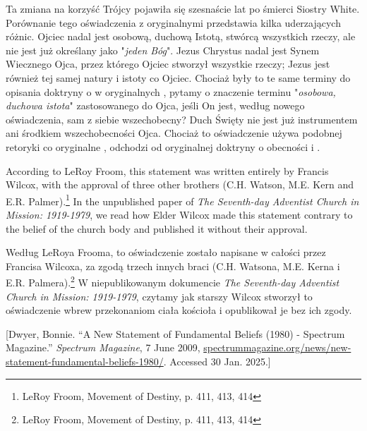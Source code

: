 Ta zmiana na korzyść Trójcy pojawiła się szesnaście lat po śmierci Siostry White. Porównanie tego oświadczenia z oryginalnymi  przedstawia kilka uderzających różnic. Ojciec nadal jest osobową, duchową Istotą, stwórcą wszystkich rzeczy, ale nie jest już określany jako "\textit{jeden Bóg}". Jezus Chrystus nadal jest Synem Wiecznego Ojca, przez którego Ojciec stworzył wszystkie rzeczy; Jezus jest również tej samej natury i istoty co Ojciec. Chociaż były to te same terminy do opisania doktryny o  w oryginalnych , pytamy o znaczenie terminu "\textit{osobowa, duchowa istota}" zastosowanego do Ojca, jeśli On jest, według nowego oświadczenia, sam z siebie wszechobecny? Duch Święty nie jest już instrumentem ani środkiem wszechobecności Ojca. Chociaż to oświadczenie używa podobnej retoryki co oryginalne , odchodzi od oryginalnej doktryny o obecności i .


According to LeRoy Froom, this statement was written entirely by Francis Wilcox, with the approval of three other brothers (C.H. Watson, M.E. Kern and E.R. Palmer).\footnote{LeRoy Froom, Movement of Destiny, p. 411, 413, 414} In the unpublished paper of \textit{The Seventh-day Adventist Church in Mission: 1919-1979}, we read how Elder Wilcox made this statement contrary to the belief of the church body and published it without their approval.


Według LeRoya Frooma, to oświadczenie zostało napisane w całości przez Francisa Wilcoxa, za zgodą trzech innych braci (C.H. Watsona, M.E. Kerna i E.R. Palmera).\footnote{LeRoy Froom, Movement of Destiny, p. 411, 413, 414} W niepublikowanym dokumencie \textit{The Seventh-day Adventist Church in Mission: 1919-1979}, czytamy jak starszy Wilcox stworzył to oświadczenie wbrew przekonaniom ciała kościoła i opublikował je bez ich zgody.


[Dwyer, Bonnie. “A New Statement of Fundamental Beliefs (1980) - Spectrum Magazine.” \textit{Spectrum Magazine}, 7 June 2009, \href{https://spectrummagazine.org/news/new-statement-fundamental-beliefs-1980/}{spectrummagazine.org/news/new-statement-fundamental-beliefs-1980/}. Accessed 30 Jan. 2025.]


